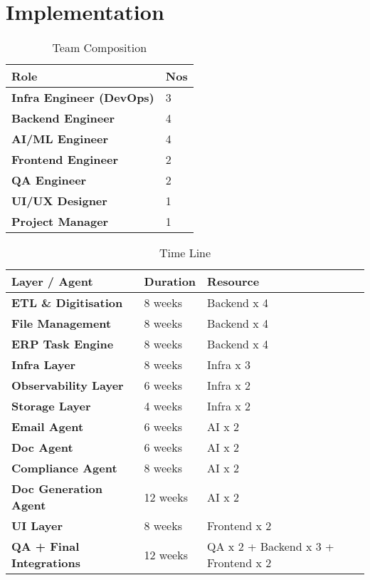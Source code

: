 \section{Implementation}

\begin{frame}
\begin{table}[h!]
\centering
\renewcommand{\arraystretch}{1.3}
\begin{tabular}{|p{5cm}|p{5cm}|}
\hline
\textbf{Role} & \textbf{Nos} \\
\hline
\textbf{Infra Engineer (DevOps)} & 3 \\
\hline
\textbf{Backend Engineer} & 4 \\
\hline
\textbf{AI/ML Engineer} & 4 \\
\hline
\textbf{Frontend Engineer} & 2 \\
\hline
\textbf{QA Engineer } & 2 \\
\hline
\textbf{UI/UX Designer} & 1 \\
\hline
\textbf{Project Manager} & 1 \\
\hline
\end{tabular}
\caption{Team Composition}
\end{table}
\end{frame}

\begin{frame}
    \begin{table}[h!]
\centering
\renewcommand{\arraystretch}{1.3}
\begin{tabular}{|p{4.5cm}|p{2.2cm}|p{5cm}|}
\hline
\textbf{Layer / Agent} & \textbf{Duration} & \textbf{Resource} \\
\hline
\textbf{ETL \& Digitisation} & 8 weeks & Backend x 4 \\
\hline
\textbf{File Management} & 8 weeks & Backend x 4 \\
\hline
\textbf{ERP Task Engine} & 8 weeks & Backend x 4 \\
\hline
\textbf{Infra Layer} & 8 weeks & Infra x 3 \\
\hline
\textbf{Observability Layer} & 6 weeks & Infra x 2 \\
\hline
\textbf{Storage Layer} & 4 weeks & Infra x 2 \\
\hline
\textbf{Email Agent} & 6 weeks & AI x 2 \\
\hline
\textbf{Doc Agent} & 6 weeks & AI x 2 \\
\hline
\textbf{Compliance Agent} & 8 weeks & AI x 2 \\
\hline
\textbf{Doc Generation Agent} & 12 weeks & AI x 2 \\
\hline
\textbf{UI Layer} & 8 weeks & Frontend x 2 \\
\hline
\textbf{QA + Final Integrations} & 12 weeks & QA x 2 + Backend x 3 + Frontend x 2 \\
\hline
\end{tabular}
\caption{Time Line}
\end{table}
\end{frame}

